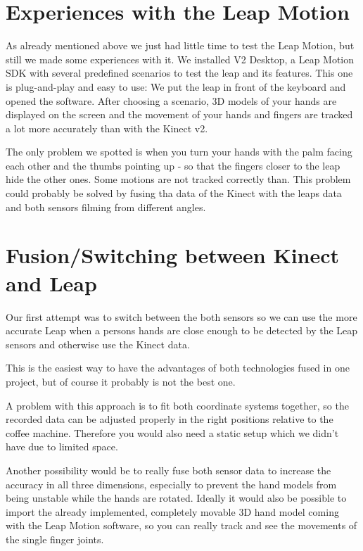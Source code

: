 \documentclass[11pt,a4paper,oldfontcommands, oneside]{memoir}
\begin{document}
\section{Experiences with the Leap Motion}
As already mentioned above we just had little time to test the Leap Motion, but still we made some experiences with it.
We installed V2 Desktop, a Leap Motion SDK with several predefined scenarios to test the leap and its features. This one is plug-and-play and easy to use: We put the leap in front of the keyboard and opened the software. After choosing a scenario, 3D models of your hands are displayed on the screen and the movement of your hands and fingers are tracked a lot more accurately than with the Kinect v2. 

The only problem we spotted is when you turn your hands with the palm facing each other and the thumbs pointing up - so that the fingers closer to the leap hide the other ones. Some motions are not tracked correctly than. This problem could probably be solved by fusing tha data of the Kinect with the leaps data and both sensors filming from different angles.

\section{Fusion/Switching between Kinect and Leap}
Our first attempt was to switch between the both sensors so we can use the more accurate Leap when a persons hands are close enough to be detected by the Leap sensors and otherwise use the Kinect data. 

This is the easiest way to have the advantages of both technologies fused in one project, but of course it probably is not the best one.

A problem with this approach is to fit both coordinate systems together, so the recorded data can be adjusted properly in the right positions relative to the coffee machine. Therefore you would also need a static setup which we didn't have due to limited space.

Another possibility would be to really fuse both sensor data to increase the accuracy in all three dimensions, especially to prevent the hand models from being unstable while the hands are rotated.
Ideally it would also be possible to import the already implemented, completely movable 3D hand model coming with the Leap Motion software, so you can really track and see the movements of the single finger joints.\\
\end{document}
